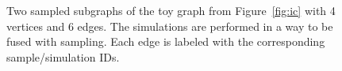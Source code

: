 \documentclass[10pt,journal,compsoc]{IEEEtran}
\begin{document}
\begin{figure}[!ht] 
    \centering
  \caption{
  \protect{} Two sampled subgraphs of the toy graph from Figure~\ref{fig:ic} with 4 vertices and 6 edges.
  \protect{} The simulations are performed in a way to be fused with sampling. Each edge is labeled with the corresponding sample/simulation IDs. 
  }
  \label{fig:traversal} 
\end{figure}
\end{document}
